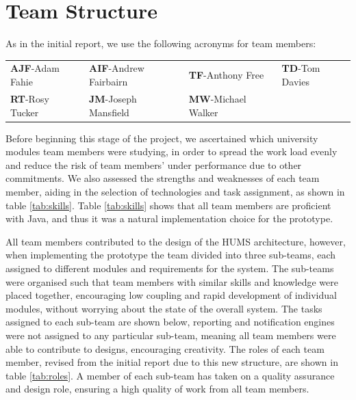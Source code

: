 \section{Team Structure}
\label{sec:team}

As in the initial report, we use the following acronyms for team members:

\begin{tabular}{ p{3cm} p{4cm} p{3.5cm} p{3.5cm} }
  \textbf{AJF}-Adam Fahie &
  \textbf{AIF}-Andrew Fairbairn &
  \textbf{TF}-Anthony Free &
  \textbf{TD}-Tom Davies \\
    \textbf{RT}-Rosy Tucker &
  \textbf{JM}-Joseph Mansfield &
  \textbf{MW}-Michael Walker \\
\end{tabular}

Before beginning this stage of the project, we ascertained which university modules team members were studying, in order to spread the work load evenly and reduce the risk of team members' under performance due to other commitments. We also assessed the strengths and weaknesses of each team member, aiding in the selection of technologies and task assignment, as shown in table \ref{tab:skills}. Table \ref{tab:skills} shows that all team members are proficient with Java, and thus it was a natural implementation choice for the prototype.

All team members contributed to the design of the HUMS architecture, however, when implementing the prototype the team divided into three sub-teams, each assigned to different modules and requirements for the system.
The sub-teams were organised such that team members with similar skills and knowledge were placed together, encouraging low coupling and rapid development of individual modules, without worrying about the state of the overall system. The tasks assigned to each sub-team are shown below, reporting and notification engines were not assigned to any particular sub-team, meaning all team members were able to contribute to designs, encouraging creativity. The roles of each team member, revised from the initial report due to this new structure, are shown in table \ref{tab:roles}. A member of each sub-team has taken on a quality assurance and design role, ensuring a high quality of work from all team members.

